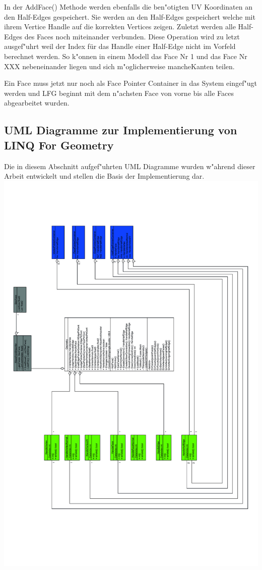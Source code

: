 \documentclass[pagesize, paper=a4, fontsize=12pt,titlepage=true, headings=small, headnosepline, abstractoff, liststotoc, nochapterprefix, plainheadsepline]{scrreprt}
\newcommand{\LFG}{LINQ For Geometry}
\begin{document}
In der AddFace() Methode werden ebenfalls die ben"otigten UV Koordinaten an den Half-Edges gespeichert. Sie werden an den Half-Edges gespeichert welche mit ihrem Vertice Handle auf die korrekten Vertices zeigen. Zuletzt werden alle Half-Edges des Faces noch miteinander verbunden. Diese Operation wird zu letzt ausgef"uhrt weil der Index für das Handle einer Half-Edge nicht im Vorfeld berechnet werden. So k"onnen in einem Modell das Face Nr 1 und das Face Nr XXX nebeneinander liegen und sich m"oglicherweise mancheKanten teilen.

Ein Face muss jetzt nur noch als Face Pointer Container in das System eingef"ugt werden und LFG beginnt mit dem n"achsten Face von vorne bis alle Faces abgearbeitet wurden.

		\subsection {UML Diagramme zur Implementierung von \LFG}
Die in diesem Abschnitt aufgef"uhrten UML Diagramme wurden w"ahrend dieser Arbeit entwickelt und stellen die Basis der Implementierung dar.
\newpage
\includegraphics[width=\linewidth]{../UML/Klassendiagramm}
\label{uml:klassendiagramm}
\end{document}
